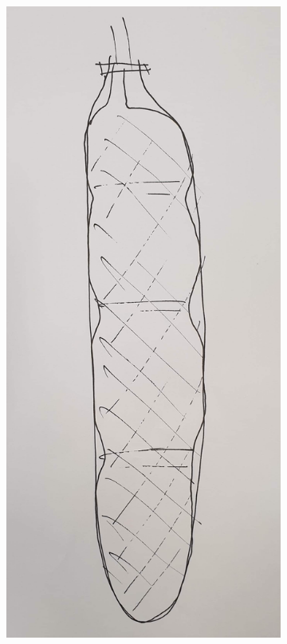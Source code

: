 \documentclass[11pt,a4paper]{article}
\begin{document}
\begin{figure}[hbt!]
    \centering
    \centering
    \begin{subfigure}[t]{0.45 \textwidth}
        \centering
        \includegraphics[scale=0.1]{MuscleRinging.png}

\end{subfigure}
\end{figure}
\end{document}
